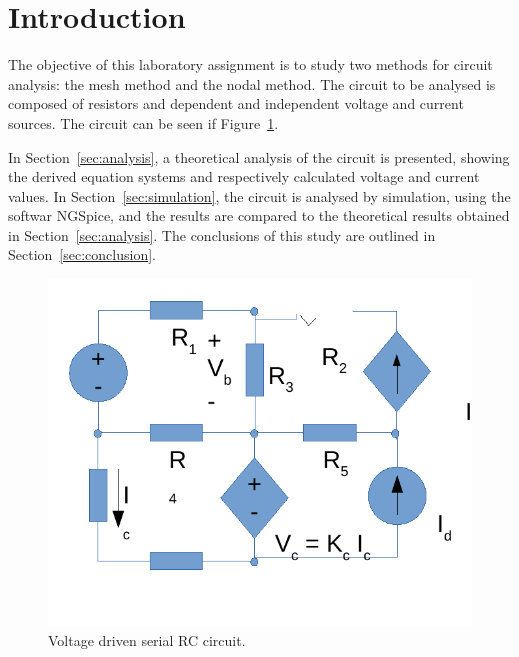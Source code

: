 \section{Introduction}
\label{sec:introduction}

\par The objective of this laboratory assignment is to study two methods for circuit analysis: the mesh method and the nodal method. The circuit to be analysed is composed of resistors and dependent and independent voltage and current sources. The circuit can be seen if Figure~\ref{fig:rc}. 

In Section~\ref{sec:analysis}, a theoretical analysis of the circuit is
presented, showing the derived equation systems and respectively calculated voltage and current values. In Section~\ref{sec:simulation}, the circuit is analysed by
simulation, using the softwar NGSpice, and the results are compared to the theoretical results obtained in
Section~\ref{sec:analysis}. The conclusions of this study are outlined in
Section~\ref{sec:conclusion}.

\begin{figure}[h] \centering
\includegraphics[width=0.4\linewidth]{rc.pdf}
\caption{Voltage driven serial RC circuit.}
\label{fig:rc}
\end{figure}
